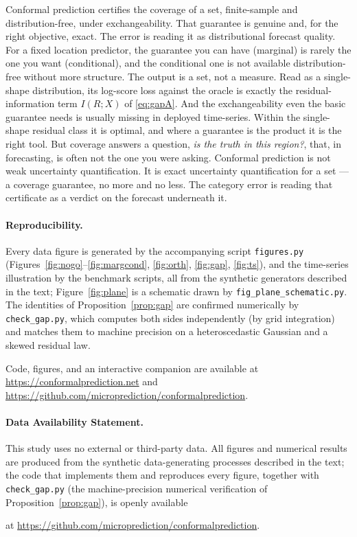 \documentclass[11pt]{article}
\newif\ifanon\anonfalse
\theoremstyle{definition}
\begin{document}
Conformal prediction certifies the coverage of a set, finite-sample and
distribution-free, under exchangeability. That guarantee is genuine and, for the right
objective, exact. The error is reading it as distributional forecast quality. For a fixed
location predictor, the guarantee you can have (marginal) is rarely the one you want
(conditional), and the conditional one is not available distribution-free without more
structure. The output is a set, not a measure. Read as a single-shape distribution, its
log-score loss against the oracle is exactly the residual-information term
$I(R;X)$ of \eqref{eq:gapA}. And the exchangeability even the basic guarantee needs is
usually missing in deployed time-series. Within the single-shape residual class it is
optimal, and where a guarantee is the product it is the right tool. But coverage answers a question,
\emph{is the truth in this region?}, that, in forecasting, is often not the one you
were asking. Conformal prediction is not weak uncertainty quantification. It is exact
uncertainty quantification for a set --- a coverage guarantee, no more and no less. The
category error is reading that certificate as a verdict on the forecast underneath it.

\paragraph{Reproducibility.} Every data figure is generated by the accompanying script
\texttt{figures.py} (Figures~\ref{fig:nogo}--\ref{fig:margcond}, \ref{fig:orth},
\ref{fig:gap}, \ref{fig:ts}), and the time-series illustration by the benchmark scripts, all
from the synthetic generators described in the text; Figure~\ref{fig:plane} is a schematic
drawn by \texttt{fig\_plane\_schematic.py}. The
identities of Proposition~\ref{prop:gap} are confirmed numerically by \texttt{check\_gap.py},
which computes both sides independently (by grid integration) and matches them to machine
precision on a heteroscedastic Gaussian and a skewed residual law.
\ifanon
Code, figures, and an interactive companion are provided as supplementary material; public
URLs are omitted for anonymous review.
\else
Code, figures, and an interactive companion are available at
\url{https://conformalprediction.net} and
\url{https://github.com/microprediction/conformalprediction}.
\fi

\paragraph{Data Availability Statement.} This study uses no external or third-party data.
All figures and numerical results are produced from the synthetic data-generating processes
described in the text; the code that implements them and reproduces every figure, together
with \texttt{check\_gap.py} (the machine-precision numerical verification of
Proposition~\ref{prop:gap}), is openly available
\ifanon
as supplementary material accompanying this submission (the public repository URL is omitted
for anonymous review).
\else
at \url{https://github.com/microprediction/conformalprediction}.
\fi
\end{document}
